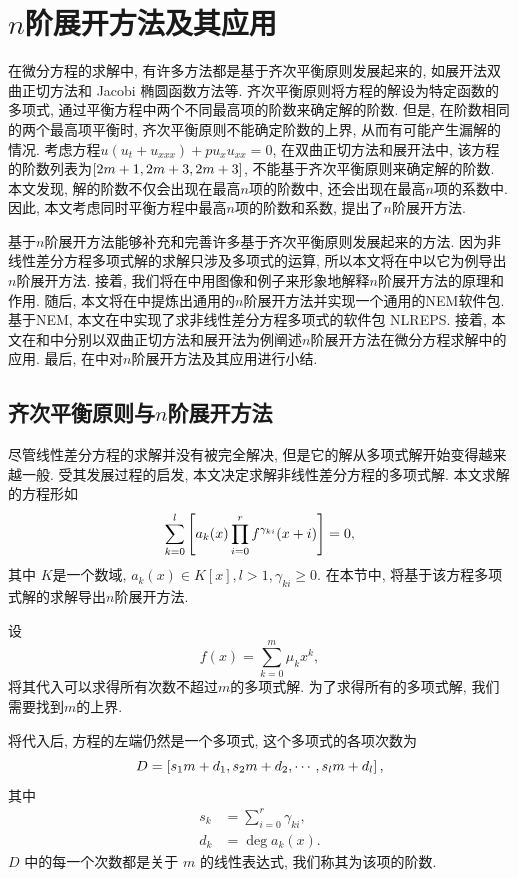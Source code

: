 \chapter{$n$阶展开方法及其应用}\label{ch04}
在微分方程的求解中, 有许多方法都是基于齐次平衡原则发展起来的, 如\Painleve{}展开法\D 双曲正切方法和 Jacobi 椭圆函数方法等. 齐次平衡原则将方程的解设为特定函数的多项式, 通过平衡方程中两个不同最高项的阶数来确定解的阶数. 但是, 在阶数相同的两个最高项平衡时, 齐次平衡原则不能确定阶数的上界, 从而有可能产生漏解的情况. 考虑方程$u(u_t+u_{xxx})+pu_x u_{xx}=0$, 在双曲正切方法和\Painleve{}展开法中, 该方程的阶数列表为$\left[2m+1,2m+3,2m+3\right]$, 不能基于齐次平衡原则来确定解的阶数. 本文发现, 解的阶数不仅会出现在最高$n$项的阶数中, 还会出现在最高$n$项的系数中. 因此, 本文考虑同时平衡方程中最高$n$项的阶数和系数, 提出了$n$阶展开方法. 

基于$n$阶展开方法能够补充和完善许多基于齐次平衡原则发展起来的方法. 因为非线性差分方程多项式解的求解只涉及多项式的运算, 所以本文将在中以它为例导出$n$阶展开方法. 接着, 我们将在中用图像和例子来形象地解释$n$阶展开方法的原理和作用. 随后, 本文将在中提炼出通用的$n$阶展开方法并实现一个通用的NEM软件包. 基于NEM, 本文在中实现了求非线性差分方程多项式的软件包 NLREPS. 接着, 本文在和中分别以双曲正切方法和\Painleve{}展开法为例阐述$n$阶展开方法在微分方程求解中的应用. 最后, 在中对$n$阶展开方法及其应用进行小结. 

\section{齐次平衡原则与$n$阶展开方法} \label{ch4sec1}
尽管线性差分方程的求解并没有被完全解决, 但是它的解从多项式解开始变得越来越一般. 受其发展过程的启发, 本文决定求解非线性差分方程的多项式解. 本文求解的方程形如
\begin{equation}
\sum_{k=0}^l{\left[a_k(x)\prod_{i=0}^r{f^{\gamma_{ki}}(x+i)}\right]}=0,
\label{eq}
\end{equation}
其中 $K$是一个数域, $a_k(x)\in K[x], l>1, \gamma_{ki}\ge 0$. 在本节中, 将基于该方程多项式解的求解导出$n$阶展开方法. 

设
\begin{equation}
f(x)=\sum_{k=0}^m{\mu_kx^k},
\label{fm1}
\end{equation}
将其代入可以求得所有次数不超过$m$的多项式解. 为了求得所有的多项式解, 我们需要找到$m$的上界.

将代入后, 方程的左端仍然是一个多项式, 这个多项式的各项次数为
\begin{equation}
D = \left[s_1 m+d_1,s_2 m+d_2,\cdots,s_l m+d_l\right],
\end{equation}
其中
\begin{equation}
\begin{aligned}
s_k&=\sum_{i=0}^r{\gamma_{ki}}, \\
d_k&=\deg a_k(x).
\end{aligned}
\label{eq-sd}
\end{equation}
$D$ 中的每一个次数都是关于 $m$ 的线性表达式, 我们称其为该项的阶数.

